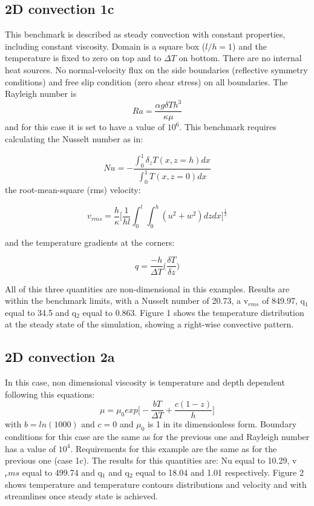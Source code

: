 \subsection{2D convection 1c}
This benchmark is described as steady convection with constant properties, including constant viscosity. Domain is a square box ($l/h = 1$) and the temperature is fixed to zero on top and to $\Delta T$ on bottom. There are no internal heat sources. No normal-velocity flux on the side boundaries (reflective symmetry conditions) and free slip condition (zero shear stress) on all boundaries. The Rayleigh number is
\begin{equation}
   Ra = \frac{\alpha g \delta T h^3}{\kappa \mu}
\end{equation}
and for this case it is set to have a value of $10^6$.
This benchmark requires calculating the Nusselt number as in:

\begin{equation}
   Nu = -\frac{\int_{0}^{1}\delta_zT(x,z=h)dx}{\int_{0}^{1}T(x,z=0)dx}
\end{equation}
the root-mean-square (rms) velocity:

\begin{equation}
   v_{rms} = \frac{h}{\kappa} \bigg[\frac{1}{hl}\int_{0}^{l}\int_{0}^{h}(u^2+w^2)dzdx\bigg]^{\frac{1}{2}}
\end{equation}

and the temperature gradients at the corners:

\begin{equation}
    q = \frac{-h}{\Delta T}\bigg(\frac{\delta T}{\delta z}\bigg)
\end{equation}

All of this three quantities are non-dimensional in this examples. Results are within the benchmark limits, with a Nusselt number of 20.73, a v$_{rms}$ of 849.97, q$_1$ equal to 34.5 and q$_2$ equal to 0.863.  
Figure 1 shows the temperature distribution at the steady state of the simulation, showing a right-wise convective pattern.


\subsection{2D convection 2a}
In this case, non dimensional viscosity is temperature and depth dependent following this equations:
\begin{equation}
    \mu = \mu_0 exp\bigg[-\frac{bT}{\Delta T} + \frac{c(1-z)}{h}\bigg]
\end{equation}
with $b = ln(1000)$ and $c = 0$ and $\mu_0$ is 1 in its dimensionless form. Boundary conditions for this case are the same as for the previous one and Rayleigh number has a value of $10^4$. Requirements for this example are the same as for the previous one (case 1c).
The results for this quantities are: Nu equal to 10.29, v$_rms$ equal to 499.74 and q$_1$ and q$_2$ equal to 18.04 and 1.01 respectively. 
Figure 2 shows temperature and temperature contours distributions and velocity and with streamlines once steady state is achieved. 

